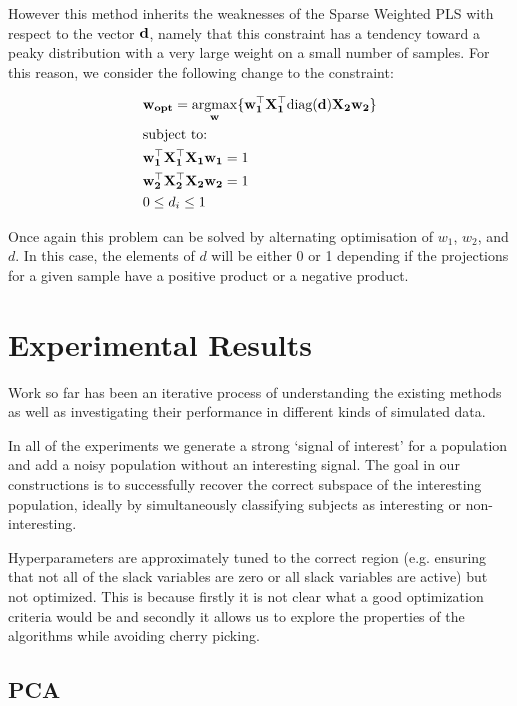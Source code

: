 However this method inherits the weaknesses of the Sparse Weighted PLS with respect to the vector $\bold{d}$, namely that this constraint has a tendency toward a peaky distribution with a very large weight on a small number of samples. For this reason, we consider the following change to the constraint:

\begin{align}
    & \bold{w_{opt}}=\underset{\bold{w}}{\mathrm{argmax}}\{ \bold{w_1^{\top}X_1^{\top}\text{diag}(d)X_2w_2}  \}\\
    & \text{subject to:} \notag\\
    & \bold{w_1^{\top}X_1^{\top}X_1w_1}=1 \notag\\
    & \bold{w_2^{\top}X_2^{\top}X_2w_2}=1 \notag\\
    & 0\leq d_i \leq 1 \notag
\end{align}

Once again this problem can be solved by alternating optimisation of $w_1$, $w_2$, and $d$. In this case, the elements of $d$ will be either 0 or 1 depending if the projections for a given sample have a positive product or a negative product.

\section{Experimental Results}

Work so far has been an iterative process of understanding the existing methods as well as investigating their performance in different kinds of simulated data.

In all of the experiments we generate a strong `signal of interest' for a population and add a noisy population without an interesting signal. The goal in our constructions is to successfully recover the correct subspace of the interesting population, ideally by simultaneously classifying subjects as interesting or non-interesting. 

Hyperparameters are approximately tuned to the correct region (e.g. ensuring that not all of the slack variables are zero or all slack variables are active) but not optimized. This is because firstly it is not clear what a good optimization criteria would be and secondly it allows us to explore the properties of the algorithms while avoiding cherry picking.

\subsection{PCA}

